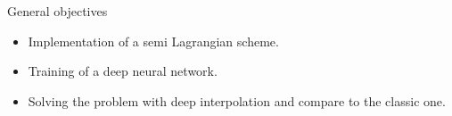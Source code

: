 \begin{frame}{General objectives}
    \begin{itemize}
        \item Implementation of a semi Lagrangian scheme.
        \item Training of a deep neural network.
        \item Solving the problem with deep interpolation and compare to the classic one.
    \end{itemize}

\end{frame}

